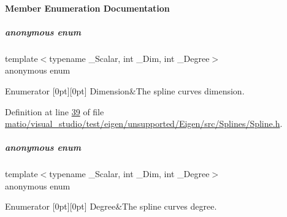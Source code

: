 \paragraph{Member Enumeration Documentation}
\mbox{\label{group___splines___module_a82c233f1d4719bc52397d64a6c96c5b0}} 
\subparagraph{\texorpdfstring{anonymous enum}{anonymous enum}}
{\footnotesize\ttfamily template$<$typename \+\_\+\+Scalar, int \+\_\+\+Dim, int \+\_\+\+Degree$>$ \\
anonymous enum}

\begin{DoxyEnumFields}{Enumerator}
[0pt][0pt]{}\mbox{\label{group___splines___module_a82c233f1d4719bc52397d64a6c96c5b0a25366e5e79da5355d259a71096d8d8a7}} 
Dimension&The spline curve\textquotesingle{}s dimension. \\
\hline

\end{DoxyEnumFields}


Definition at line \hyperlink{matio_2visual__studio_2test_2eigen_2unsupported_2_eigen_2src_2_splines_2_spline_8h_source_l00039}{39} of file \hyperlink{matio_2visual__studio_2test_2eigen_2unsupported_2_eigen_2src_2_splines_2_spline_8h_source}{matio/visual\+\_\+studio/test/eigen/unsupported/\+Eigen/src/\+Splines/\+Spline.\+h}.

\mbox{\label{group___splines___module_a40cd07294408f87d39763e15b331b4d1}} 
\subparagraph{\texorpdfstring{anonymous enum}{anonymous enum}}
{\footnotesize\ttfamily template$<$typename \+\_\+\+Scalar, int \+\_\+\+Dim, int \+\_\+\+Degree$>$ \\
anonymous enum}

\begin{DoxyEnumFields}{Enumerator}
[0pt][0pt]{}\mbox{\label{group___splines___module_a40cd07294408f87d39763e15b331b4d1a7bc38582fb1bae7db67c89b6c5f45f24}} 
Degree&The spline curve\textquotesingle{}s degree. \\
\hline

\end{DoxyEnumFields}


